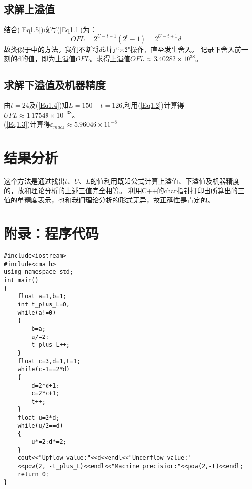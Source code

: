 \documentclass[a4paper,11pt,openany,notitlepage]{book}
\begin{document}
\subsection{求解上溢值}
结合(\ref{Eq1.5})改写(\ref{Eq1.1})为：
\[
    OFL = 2^{U-t+1} (2^{t} - 1) = 2^{U-t+1} d
\]
故类似于\MakeUppercase{}中的方法，我们不断将$d$进行“$\times 2$"操作，直至发生舍入。
记录下舍入前一刻的d的值，即为上溢值$OFL$。求得上溢值$OFL \approx 3.40282 \times 10^{38}$。

\subsection{求解下溢值及机器精度}
由$t = 24$及(\ref{Eq1.4})知$L = 150 - t = 126$,利用(\ref{Eq1.2})计算得$UFL \approx 1.17549 \times 10^{-38}$。\\
(\ref{Eq1.3})计算得$\varepsilon_{mach} \approx 5.96046 \times 10^{-8}$

\section{结果分析}
这个方法是通过找出$t$、$U$、$L$的值利用既知公式计算上溢值、下溢值及机器精度的，故和理论分析的上述三值完全相等。
利用C++的char指针打印出所算出的三值的单精度表示，也和我们理论分析的形式无异，故正确性是肯定的。

\section{附录：程序代码}
\begin{lstlisting}
#include<iostream>
#include<cmath>
using namespace std;
int main()
{
    float a=1,b=1;
    int t_plus_L=0;
    while(a!=0)
    {
        b=a;
        a/=2;
        t_plus_L++;
    }
    float c=3,d=1,t=1;
    while(c-1==2*d)
    {
        d=2*d+1;
        c=2*c+1;
        t++;
    }
    float u=2*d;
    while(u/2==d)
    {
        u*=2;d*=2;
    }
    cout<<"Upflow value:"<<d<<endl<<"Underflow value:"
    <<pow(2,t-t_plus_L)<<endl<<"Machine precision:"<<pow(2,-t)<<endl;
    return 0;
}
\end{lstlisting}
\end{document}
